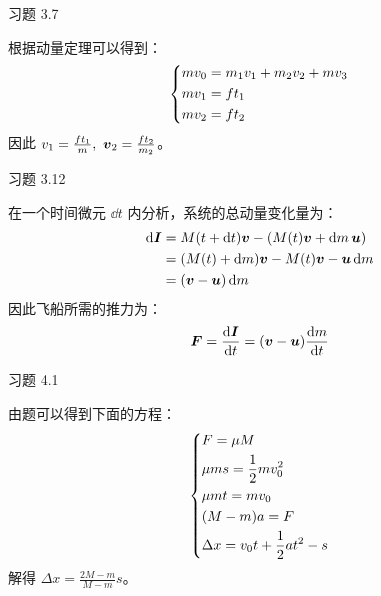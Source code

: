 \begin{problem}
    习题 3.7
    \begin{solution}
        根据动量定理可以得到：
        $$
        \begin{dcases}
            m v_0 = m_1 v_1 + m_2 v_2 + m v_3 \\
            m v_1 = f t_1 \\
            m v_2 = f t_2 \\
        \end{dcases}
        $$
        因此 $v_1 = \frac{f t_1}{m},\ \boldsymbol{v}_2 = \frac{f t_2}{m_2}$。
    \end{solution}
\end{problem}

\begin{problem}
    习题 3.12
    \begin{solution}
        在一个时间微元 $\dd{t}$ 内分析，系统的总动量变化量为：
        $$
        \begin{aligned}
            \dd{\boldsymbol{I}} & = M(t + \dd{t}) \boldsymbol{v} - (M(t) \boldsymbol{v} + \dd{m} \boldsymbol{u}) \\  
            & = (M(t) + \dd{m}) \boldsymbol{v} - M(t) \boldsymbol{v} - \boldsymbol{u} \dd{m} \\
            & = (\boldsymbol{v} - \boldsymbol{u}) \dd{m}
        \end{aligned}
        $$
        因此飞船所需的推力为：
        $$
        \boldsymbol{F} = \dv{\boldsymbol{I}}{t} = (\boldsymbol{v} - \boldsymbol{u}) \dv{m}{t}
        $$
    \end{solution}
\end{problem}

\begin{problem}
    习题 4.1
    \begin{solution}
        由题可以得到下面的方程：
        $$
        \begin{dcases}
            F = \mu M \\
            \mu m s = \frac{1}{2} m v_0^2 \\
            \mu m t = m v_0 \\
            (M - m) a = F \\
            \Delta x = v_0 t + \frac{1}{2} a t^2 - s
        \end{dcases}
        $$
        解得 $\Delta x = \frac{2M - m}{M - m} s$。
    \end{solution}
\end{problem}

